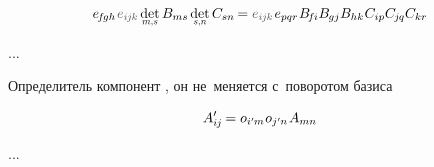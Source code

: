 \begin{otherlanguage}{russian}
\[
e_{\hspace{-0.25ex}f\hspace{-0.2ex}gh} \hspace{.2ex} \mathcolor{black!66}{e_{i\hspace{-0.1ex}j\hspace{-0.1ex}k}} \hspace{.33ex} \underset{\raisebox{.15em}{\scalebox{0.7}{$m$,$s$}}}{\operatorname{det}} \, B_{ms} \hspace{.33ex} \underset{\raisebox{.15em}{\scalebox{0.7}{$s$,$n$}}}{\operatorname{det}} \, C_{sn} \hspace{-0.2ex}
= \mathcolor{black!66}{e_{i\hspace{-0.1ex}j\hspace{-0.1ex}k}} \hspace{.2ex} e_{pqr} \hspace{.1ex} B_{\hspace{-0.25ex}f\hspace{-0.1ex}i} B_{\hspace{-0.1ex}gj} B_{hk} \hspace{.1ex} C_{ip} C_{\hspace{-0.1ex}j\hspace{-0.1ex}q} C_{kr}
\hspace{-0.2ex}
\]

...

Определитель компонент  , он не~меняется с~поворотом базиса

\nopagebreak\vspace{-0.2em}\begin{equation*}
A'_{i\hspace{-0.1ex}j} \hspace{-0.16ex} = o_{i'\hspace{-0.1ex}m} \hspace{.1ex} o_{j'\hspace{-0.1ex}n} \hspace{.16ex} A_{mn}
\end{equation*}

...

\end{otherlanguage}


